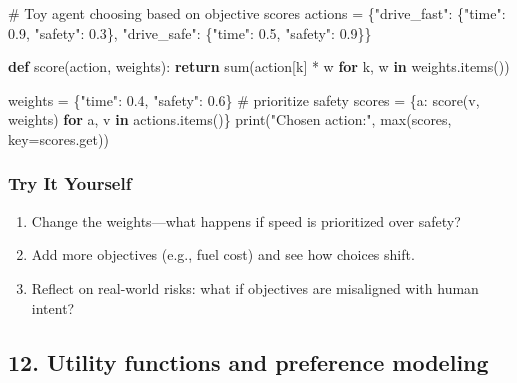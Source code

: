 \documentclass[
  letterpaper,
  DIV=11,
  numbers=noendperiod]{scrreprt}
\newenvironment{Shaded}{\begin{snugshade}}{\end{snugshade}}
\newcommand{\BuiltInTok}[1]{\textcolor[rgb]{0.00,0.23,0.31}{#1}}
\newcommand{\CommentTok}[1]{\textcolor[rgb]{0.37,0.37,0.37}{#1}}
\newcommand{\ControlFlowTok}[1]{\textcolor[rgb]{0.00,0.23,0.31}{\textbf{#1}}}
\newcommand{\FloatTok}[1]{\textcolor[rgb]{0.68,0.00,0.00}{#1}}
\newcommand{\KeywordTok}[1]{\textcolor[rgb]{0.00,0.23,0.31}{\textbf{#1}}}
\newcommand{\NormalTok}[1]{\textcolor[rgb]{0.00,0.23,0.31}{#1}}
\newcommand{\OperatorTok}[1]{\textcolor[rgb]{0.37,0.37,0.37}{#1}}
\newcommand{\StringTok}[1]{\textcolor[rgb]{0.13,0.47,0.30}{#1}}
\providecommand{\tightlist}{%
  \setlength{\itemsep}{0pt}\setlength{\parskip}{0pt}}
\begin{document}
\begin{Shaded}
\begin{Highlighting}[]
\CommentTok{\# Toy agent choosing based on objective scores}
\NormalTok{actions }\OperatorTok{=}\NormalTok{ \{}\StringTok{"drive\_fast"}\NormalTok{: \{}\StringTok{"time"}\NormalTok{: }\FloatTok{0.9}\NormalTok{, }\StringTok{"safety"}\NormalTok{: }\FloatTok{0.3}\NormalTok{\},}
           \StringTok{"drive\_safe"}\NormalTok{: \{}\StringTok{"time"}\NormalTok{: }\FloatTok{0.5}\NormalTok{, }\StringTok{"safety"}\NormalTok{: }\FloatTok{0.9}\NormalTok{\}\}}

\KeywordTok{def}\NormalTok{ score(action, weights):}
    \ControlFlowTok{return} \BuiltInTok{sum}\NormalTok{(action[k] }\OperatorTok{*}\NormalTok{ w }\ControlFlowTok{for}\NormalTok{ k, w }\KeywordTok{in}\NormalTok{ weights.items())}

\NormalTok{weights }\OperatorTok{=}\NormalTok{ \{}\StringTok{"time"}\NormalTok{: }\FloatTok{0.4}\NormalTok{, }\StringTok{"safety"}\NormalTok{: }\FloatTok{0.6}\NormalTok{\}  }\CommentTok{\# prioritize safety}
\NormalTok{scores }\OperatorTok{=}\NormalTok{ \{a: score(v, weights) }\ControlFlowTok{for}\NormalTok{ a, v }\KeywordTok{in}\NormalTok{ actions.items()\}}
\BuiltInTok{print}\NormalTok{(}\StringTok{"Chosen action:"}\NormalTok{, }\BuiltInTok{max}\NormalTok{(scores, key}\OperatorTok{=}\NormalTok{scores.get))}
\end{Highlighting}
\end{Shaded}

\subsubsection{Try It Yourself}\label{try-it-yourself-10}

\begin{enumerate}
\def\labelenumi{\arabic{enumi}.}
\tightlist
\item
  Change the weights---what happens if speed is prioritized over safety?
\item
  Add more objectives (e.g., fuel cost) and see how choices shift.
\item
  Reflect on real-world risks: what if objectives are misaligned with
  human intent?
\end{enumerate}

\subsection{12. Utility functions and preference
modeling}\label{utility-functions-and-preference-modeling}
\end{document}
